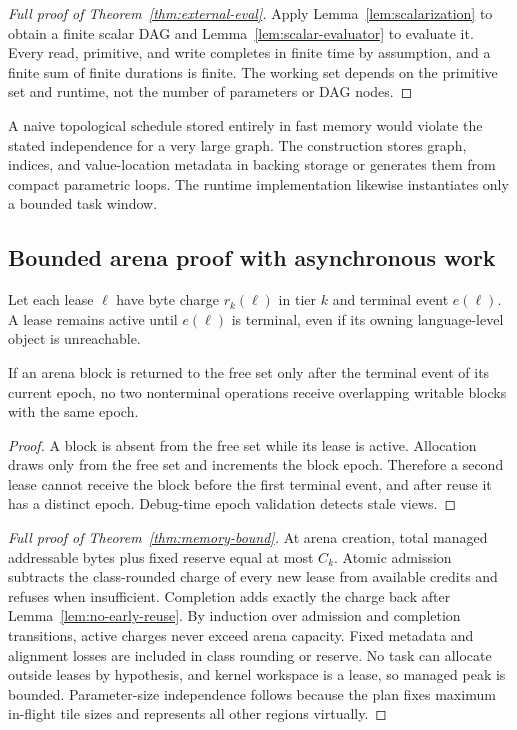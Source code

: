 \begin{proof}[Full proof of Theorem~\ref{thm:external-eval}]
Apply Lemma~\ref{lem:scalarization} to obtain a finite scalar DAG and Lemma~\ref{lem:scalar-evaluator} to evaluate it. Every read, primitive, and write completes in finite time by assumption, and a finite sum of finite durations is finite. The working set depends on the primitive set and runtime, not the number of parameters or DAG nodes.
\end{proof}

\begin{remark}
A naive topological schedule stored entirely in fast memory would violate the stated independence for a very large graph. The construction stores graph, indices, and value-location metadata in backing storage or generates them from compact parametric loops. The runtime implementation likewise instantiates only a bounded task window.
\end{remark}

\subsection{Bounded arena proof with asynchronous work}

Let each lease $\ell$ have byte charge $r_k(\ell)$ in tier $k$ and terminal event $e(\ell)$. A lease remains active until $e(\ell)$ is terminal, even if its owning language-level object is unreachable.

\begin{lemma}
\label{lem:no-early-reuse}
If an arena block is returned to the free set only after the terminal event of its current epoch, no two nonterminal operations receive overlapping writable blocks with the same epoch.
\end{lemma}

\begin{proof}
A block is absent from the free set while its lease is active. Allocation draws only from the free set and increments the block epoch. Therefore a second lease cannot receive the block before the first terminal event, and after reuse it has a distinct epoch. Debug-time epoch validation detects stale views.
\end{proof}

\begin{proof}[Full proof of Theorem~\ref{thm:memory-bound}]
At arena creation, total managed addressable bytes plus fixed reserve equal at most $C_k$. Atomic admission subtracts the class-rounded charge of every new lease from available credits and refuses when insufficient. Completion adds exactly the charge back after Lemma~\ref{lem:no-early-reuse}. By induction over admission and completion transitions, active charges never exceed arena capacity. Fixed metadata and alignment losses are included in class rounding or reserve. No task can allocate outside leases by hypothesis, and kernel workspace is a lease, so managed peak is bounded. Parameter-size independence follows because the plan fixes maximum in-flight tile sizes and represents all other regions virtually.
\end{proof}

